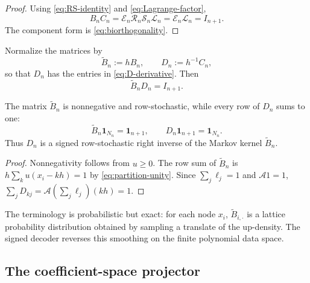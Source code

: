 \documentclass[11pt,oneside]{article}
\numberwithin{equation}{section}
\theoremstyle{definition}
\theoremstyle{remark}
\newcommand{\App}{\mathscr A}
\newcommand{\Eval}{\mathcal E}
\newcommand{\Rec}{\mathcal L}
\newcommand{\Synth}{\mathcal R}
\newcommand{\Coeff}{\mathcal S}
\begin{document}
\begin{proof}
Using \eqref{eq:RS-identity} and \eqref{eq:Lagrange-factor},
\[
 B_nC_n=\Eval_n\Synth_n\Coeff_n\Rec_n
       =\Eval_n\Rec_n=I_{n+1}.
\]
The component form is \eqref{eq:biorthogonality}.
\end{proof}

Normalize the matrices by
\begin{equation}
 \widetilde B_n:=hB_n,
 \qquad D_n:=h^{-1}C_n,
 \label{eq:normalized-BD}
\end{equation}
so that $D_n$ has the entries in \eqref{eq:D-derivative}.  Then
\begin{equation}
 \widetilde B_nD_n=I_{n+1}.
 \label{eq:BtildeD}
\end{equation}

\begin{proposition}
\label{prop:Markov-pair}
The matrix $\widetilde B_n$ is nonnegative and row-stochastic, while every
row of $D_n$ sums to one:
\begin{equation}
 \widetilde B_n\bm1_{N_n}=\bm1_{n+1},
 \qquad
 D_n\bm1_{n+1}=\bm1_{N_n}.
 \label{eq:row-unital}
\end{equation}
Thus $D_n$ is a signed row-stochastic right inverse of the Markov kernel
$\widetilde B_n$.
\end{proposition}

\begin{proof}
Nonnegativity follows from $u\ge0$.  The row sum of $\widetilde B_n$ is
$h\sum_ku(x_i-kh)=1$ by \eqref{eq:partition-unity}.  Since
$\sum_j\ell_j=1$ and $\App1=1$,
$\sum_jD_{kj}=\App(\sum_j\ell_j)(kh)=1$.
\end{proof}

The terminology is probabilistic but exact: for each node $x_i$,
$\widetilde B_{i,\cdot}$ is a lattice probability distribution obtained by
sampling a translate of the up-density.  The signed decoder reverses this
smoothing on the finite polynomial data space.

\subsection{The coefficient-space projector}
\end{document}
